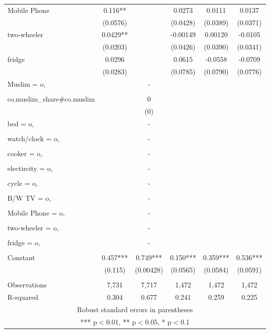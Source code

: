 \begin{tabular}{lccccc}
Mobile Phone & 0.116** &  & 0.0273 & 0.0111 & 0.0137 \\
 & (0.0576) &  & (0.0428) & (0.0389) & (0.0371) \\
two-wheeler & 0.0429** &  & -0.00149 & 0.00120 & -0.0105 \\
 & (0.0203) &  & (0.0426) & (0.0390) & (0.0341) \\
fridge & 0.0296 &  & 0.0615 & -0.0558 & -0.0709 \\
 & (0.0283) &  & (0.0785) & (0.0790) & (0.0776) \\
Muslim = o, &  & - &  &  &  \\
 &  &  &  &  &  \\
co.muslim\_share\#co.muslim &  & 0 &  &  &  \\
 &  & (0) &  &  &  \\
bed = o, &  & - &  &  &  \\
 &  &  &  &  &  \\
watch/clock = o, &  & - &  &  &  \\
 &  &  &  &  &  \\
cooker = o, &  & - &  &  &  \\
 &  &  &  &  &  \\
electircity = o, &  & - &  &  &  \\
 &  &  &  &  &  \\
cycle = o, &  & - &  &  &  \\
 &  &  &  &  &  \\
B/W TV = o, &  & - &  &  &  \\
 &  &  &  &  &  \\
Mobile Phone = o, &  & - &  &  &  \\
 &  &  &  &  &  \\
two-wheeler = o, &  & - &  &  &  \\
 &  &  &  &  &  \\
fridge = o, &  & - &  &  &  \\
 &  &  &  &  &  \\
Constant & 0.457*** & 0.749*** & 0.150*** & 0.359*** & 0.536*** \\
 & (0.115) & (0.00428) & (0.0565) & (0.0584) & (0.0591) \\
 &  &  &  &  &  \\
Observations & 7,731 & 7,717 & 1,472 & 1,472 & 1,472 \\
 R-squared & 0.304 & 0.677 & 0.241 & 0.259 & 0.225 \\ \hline
\multicolumn{6}{c}{ Robust standard errors in parentheses} \\
\multicolumn{6}{c}{ *** p$<$0.01, ** p$<$0.05, * p$<$0.1} \\
\end{tabular}
